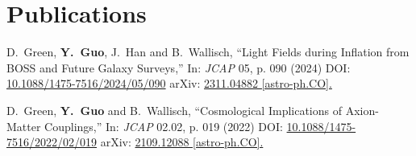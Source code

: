 \documentclass[letterpaper,12pt]{article}
\begin{document}
\section{Publications}

D.~Green, \textbf{Y.~Guo}, J.~Han and B.~Wallisch,
``Light Fields during Inflation from BOSS and Future Galaxy Surveys,''
In: \textit{JCAP} 05, p. 090 (2024)
DOI: \href{https://iopscience.iop.org/article/10.1088/1475-7516/2024/05/090}{10.1088/1475-7516/2024/05/090}
arXiv: \href{https://arxiv.org/abs/2311.04882}{2311.04882 [astro-ph.CO].}

D.~Green, \textbf{Y.~Guo} and B.~Wallisch,
``Cosmological Implications of Axion-Matter Couplings,''
In: \textit{JCAP} 02.02, p. 019 (2022)
DOI: \href{https://iopscience.iop.org/article/10.1088/1475-7516/2022/02/019}{10.1088/1475-7516/2022/02/019}
arXiv: \href{https://arxiv.org/abs/2109.12088?context=hep-ph}{2109.12088 [astro-ph.CO].}
\end{document}
